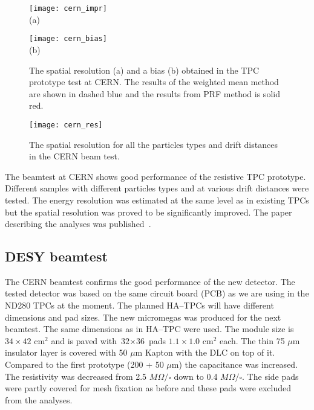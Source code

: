 \documentclass[../main.tex]{subfiles}
\begin{document}
\begin{figure}[!ht]
  \centering
  \begin{minipage}{0.49\linewidth}
    \centering
    \texttt{[image: cern\_impr]} \\ (a)
  \end{minipage}
  \begin{minipage}{0.49\linewidth}
    \centering
    \texttt{[image: cern\_bias]} \\ (b)
  \end{minipage}
  \caption{The spatial resolution (a) and a bias (b) obtained in the TPC prototype test at CERN. The results of the weighted mean method are shown in dashed blue and the results from PRF method is solid red.}
  \label{fig:tpc:cern_sr}
\end{figure}

\begin{figure}[!ht]
  \centering
  \texttt{[image: cern\_res]}
  \caption{The spatial resolution for all the particles types and drift distances in the CERN beam test.}
  \label{fig:tpc:sr_tot}
\end{figure}

The beamtest at CERN shows good performance of the resistive TPC prototype. Different samples with different particles types and at various drift distances were tested. The energy resolution was estimated at the same level as in existing TPCs but the spatial resolution was proved to be significantly improved. The paper describing the analyses was published~\cite{Attie2019b}.

\subsection{DESY beamtest}
The CERN beamtest confirms the good performance of the new detector. The tested detector was based on the same circuit board (PCB) as we are using in the ND280 TPCs at the moment. The planned HA--TPCs will have different dimensions and pad sizes. The new micromegas was produced for the next beamtest. The same dimensions as in HA--TPC were used. The module size is $\text{34}\times\text{42}\text{ cm}^2$ and is paved with $\text{32}\times\text{36}$ pads $\text{1.1}\times\text{1.0}\text{ cm}^2$ each. The thin 75 $\mu\text{m}$ insulator layer is covered with 50 $\mu\text{m}$ Kapton with the DLC on top of it. Compared to the first prototype (200 + 50 $\mu\text{m}$) the capacitance was increased. The resistivity was decreased from 2.5 $M\Omega/\square$ down to 0.4 $M\Omega/\square$. The side pads were partly covered for mesh fixation as before and these pads were excluded from the analyses.
\end{document}
